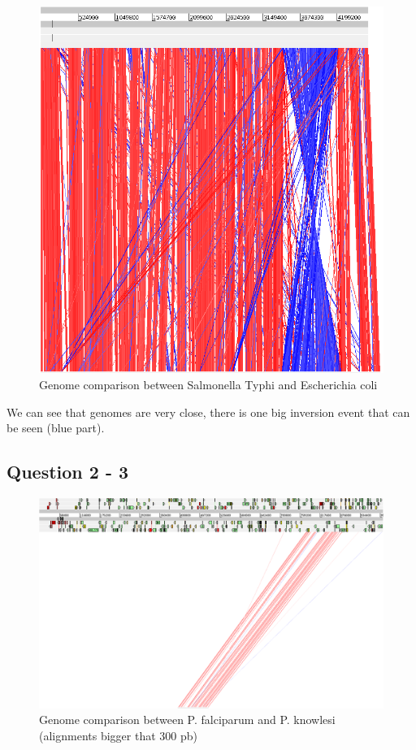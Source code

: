\documentclass[]{article}
\theoremstyle{definition}
\begin{document}
 \begin{figure}[H]
 	\centering
 	\includegraphics*[scale=0.4]{image/q1.png}
 	\caption{ Genome comparison between Salmonella Typhi and Escherichia coli}
 \end{figure}

We can see that genomes are very close, there is one big inversion event that can be seen (blue part).

 
\subsection{Question 2 - 3}

 \begin{figure}[H]
	\centering
	\includegraphics*[scale=0.3]{image/q2.png}
	\caption{ Genome comparison between P. falciparum and P. knowlesi (alignments bigger that 300 pb)}
\end{figure}
\end{document}
